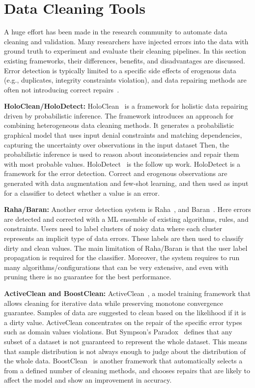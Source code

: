 
\section{Data Cleaning Tools}
\label{sec:data_cleaning_tools}

A huge effort has been made in the research community to automate data cleaning and validation. 
Many researchers have injected errors into the data with ground truth to experiment and evaluate their cleaning pipelines.
In this section existing frameworks, their differences, benefits, and disadvantages are discussed.
Error detection is typically limited to a specific side effects of erogenous data (e.g., duplicates, integrity constraints violation), and data repairing methods are often not introducing correct repairs~\cite{RekatsinasCIR2017}.

\textbf{HoloClean/HoloDetect:} 
HoloClean~\cite{RekatsinasCIR2017} is a framework for holistic data repairing driven by probabilistic inference. The framework introduces an approach for combining heterogeneous data cleaning methods.
It generates a probabilistic graphical model that uses input denial constraints and matching dependencies, capturing the uncertainty over observations in the input dataset Then, the probabilistic inference is used to reason about inconsistencies and repair them with most probable values. %
HoloDetect~\cite{holodetect} is the follow up work. HoloDetect is a framework for the error detection.
Correct and erogenous observations are generated with data augmentation and few-shot learning, and then used as input for a classifier to detect whether a value is an error.

\textbf{Raha/Baran:} 
Another error detection system is Raha~\cite{raha}, and Baran~\cite{baran}.
Here errors are detected and corrected with a ML ensemble of existing algorithms, rules, and constraints.
Users need to label clusters of noisy data where each cluster represents an implicit type of data errors.
These labels are then used to classify dirty and clean values. 
The main limitation of Raha/Baran is that the user label propagation is required for the classifier.
Moreover, the system requires to run many algorithms/configurations that can be very extensive, and even with pruning there is no guarantee for the best performance.

\textbf{ActiveClean and BoostClean:} 
ActiveClean~\cite{activeclean}, a model training framework that allows cleaning for iterative data while preserving monotone convergence guarantee.
Samples of data are suggested to clean based on the likelihood if it is a dirty value.
ActiveClean concentrates on the repair of the specific error types such as domain values violations.
But Sympson's Paradox~\cite{activeclean} defines that any subset of a dataset is not guaranteed to represent the whole dataset.
This means that sample distribution is not always enough to judge about the distribution of the whole data. 
BoostClean~\cite{boostclean} is another framework that automatically selects a from a defined number of cleaning methods, and chooses repairs that are likely to affect the model and show an improvement in accuracy. 

